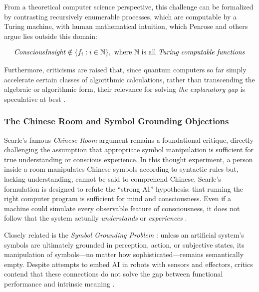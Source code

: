 From a theoretical computer science perspective, this challenge can be formalized by contrasting recursively enumerable processes, which are computable by a Turing machine, with human mathematical intuition, which Penrose and others argue lies outside this domain:

\vspace{-2.0\baselineskip}
\begin{equation}
\text{\textit{ConsciousInsight}} \notin \{f_i : i \in \mathbb{N}\}, \text{ where } \mathbb{N} \text{ is all \textit{Turing computable functions}}
\label{eq:uncomputability}
\end{equation}
\vspace{-2.0\baselineskip}

Furthermore, criticisms are raised that, since quantum computers so far simply accelerate certain classes of algorithmic calculations, rather than transcending the algebraic or algorithmic form, their relevance for solving \emph{the explanatory gap} is speculative at best \cite{garridomerchan2024machine}.

\subsubsection{The Chinese Room and Symbol Grounding Objections}

Searle's \cite{searle1980minds} famous \emph{Chinese Room} argument remains a foundational critique, directly challenging the assumption that appropriate symbol manipulation is sufficient for true understanding or conscious experience. In this thought experiment, a person inside a room manipulates Chinese symbols according to syntactic rules but, lacking understanding, cannot be said to comprehend Chinese. Searle's formulation is designed to refute the ``strong AI'' hypothesis: that running the right computer program is sufficient for mind and consciousness. Even if a machine could simulate every observable feature of consciousness, it does not follow that the system actually \emph{understands} or \emph{experiences} \cite{garridomerchan2024machine}.

Closely related is the \emph{Symbol Grounding Problem} \cite{harnad1990symbol}: unless an artificial system's symbols are ultimately grounded in perception, action, or subjective states, its manipulation of symbols---no matter how sophisticated---remains semantically empty. Despite attempts to embed AI in robots with sensors and effectors, critics contend that these connections do not solve the gap between functional performance and intrinsic meaning \cite{gamez2008progress}.

